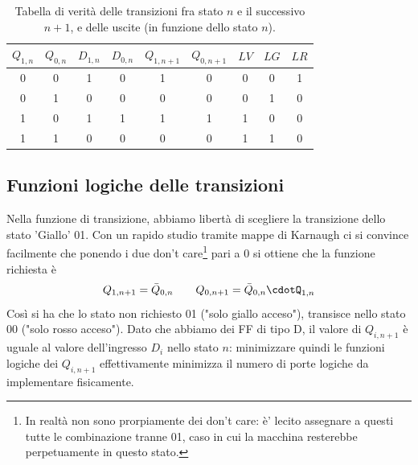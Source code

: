 \documentclass[10pt,a4paper]{article}
\begin{document}
\begin{table}[!htb]
\centering
\begin{tabular}{|c|c|c|c||c|c||c|c|c|}
\hline
$Q_{1,n}$ & $Q_{0,n}$ & $D_{1, n}$ & $D_{0, n}$& $Q_{1,n+1}$ & $Q_{0,n+1}$ & $LV$ & $LG$ & $LR$\\
\hline
0 & 0 & 1 & 0 & 1 & 0 & 0 & 0 & 1 \\
0 & 1 & 0 & 0 & 0 & 0 & 0 & 1 & 0\\
1 & 0 & 1 & 1 & 1 & 1 & 1 & 0 & 0\\
1 & 1 & 0 & 0 & 0 & 0 & 1 & 1 & 0\\
\hline
\end{tabular}
\caption{Tabella di verità delle transizioni fra stato $n$ e il successivo $n+1$, e delle uscite (in funzione dello stato $n$).\label{tab:transizioneenabled}}
\end{table}
\subsection{Funzioni logiche delle transizioni}
Nella funzione di transizione, abbiamo libertà di scegliere la transizione dello stato 'Giallo' 01.
Con un rapido studio tramite mappe di Karnaugh ci si convince facilmente che ponendo i due don't care\footnote{In realtà non sono prorpiamente dei don't care: è' lecito assegnare a questi  tutte le combinazione tranne 01, caso in cui la macchina resterebbe perpetuamente in questo stato.} pari a 0 si ottiene che la funzione richiesta è \begin{equation}
Q_{1, n+1} = \bar{Q}_{0,n}\qquad Q_{0,n+1} = \bar{Q}_{0,n}\cdotQ_{1,n} 
\end{equation}
Così si ha che lo stato non richiesto 01 ("solo giallo acceso"), transisce nello stato 00 ("solo rosso acceso").
Dato che abbiamo dei FF di tipo D, il valore di $Q_{i, n+1}$ è uguale al valore dell'ingresso $D_i$ nello stato $n$: minimizzare quindi le funzioni logiche dei $Q_{i,n+1}$ effettivamente minimizza il numero di porte logiche da implementare fisicamente.
\end{document}
